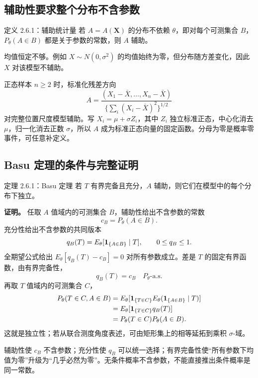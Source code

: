 \subsection{辅助性要求整个分布不含参数}
\begin{definitionbox}{定义 2.6.1：辅助统计量}
若 $A=A(\mathbf X)$ 的分布不依赖 $\theta$，即对每个可测集合 $B$，
$P_\theta(A\in B)$ 都是关于参数的常数，则 $A$ 辅助。
\end{definitionbox}

均值恒定不够。例如 $X\sim N(0,\sigma^2)$ 的均值始终为零，但分布随方差变化，因此 $X$ 对该模型不辅助。

正态样本 $n\ge2$ 时，标准化残差方向
\[
 A=\frac{(X_1-\bar X,\ldots,X_n-\bar X)}
 {\{\sum_i(X_i-\bar X)^2\}^{1/2}}
\]
对完整位置尺度模型辅助。写 $X_i=\mu+\sigma Z_i$，其中 $Z_i$ 独立标准正态，中心化消去 $\mu$，归一化消去正数 $\sigma$，所以 $A$ 成为标准正态向量的固定函数。分母为零是概率零事件，可任意补定义。

\subsection{Basu 定理的条件与完整证明}
\begin{definitionbox}{定理 2.6.1：Basu 定理}
若 $T$ 有界完备且充分，$A$ 辅助，则它们在模型中的每个分布下独立。
\end{definitionbox}

\textbf{证明。} 任取 $A$ 值域内的可测集合 $B$，辅助性给出不含参数的常数
\[
 c_B=P_\theta(A\in B).
\]
充分性给出不含参数的共同版本
\[
 q_B(T)=E_\theta[\mathbf 1_{\{A\in B\}}\mid T],\qquad 0\le q_B\le1.
\]
全期望公式给出 $E_\theta[q_B(T)-c_B]=0$ 对所有参数成立。差是 $T$ 的固定有界函数，由有界完备性，
\[
 q_B(T)=c_B\quad P_\theta\text{-a.s.}
\]
再取 $T$ 值域内的可测集合 $C$，
\[
 \begin{aligned}
 P_\theta(T\in C,A\in B)
 &=E_\theta[\mathbf 1_{\{T\in C\}}E_\theta(\mathbf 1_{\{A\in B\}}\mid T)]\\
 &=E_\theta[\mathbf 1_{\{T\in C\}}q_B(T)]\\
 &=P_\theta(T\in C)P_\theta(A\in B).
 \end{aligned}
\]
这就是独立性；若从联合测度角度表述，可由矩形集上的相等延拓到乘积 $\sigma$-域。

\begin{notebox}[三个条件各用在哪里？]
辅助性使 $c_B$ 不含参数；充分性使 $q_B$ 可以统一选择；有界完备性使“所有参数下均值为零”升级为“几乎必然为零”。无条件概率不含参数，不能直接推出条件概率是同一常数。
\end{notebox}

